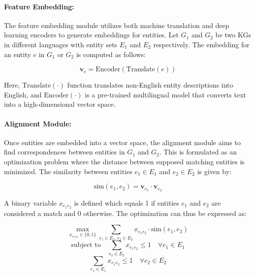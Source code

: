 \paragraph{Feature Embedding:}  The feature embedding module utilizes both machine translation and deep learning encoders to generate embeddings for entities. Let $G_1$ and $G_2$ be two KGs in different languages with entity sets $E_1$ and $E_2$ respectively. The embedding for an entity $e$ in $G_1$ or $G_2$ is computed as follows:

\begin{equation}
	\mathbf{v}_e = \text{Encoder}(\text{Translate}(e))
\end{equation}

Here, $\text{Translate}(\cdot)$ function translates non-English entity descriptions into English, and $\text{Encoder}(\cdot)$ is a pre-trained multilingual model that converts text into a high-dimensional vector space.

\paragraph{Alignment Module:} Once entities are embedded into a vector space, the alignment module aims to find correspondences between entities in $G_1$ and $G_2$. This is formulated as an optimization problem where the distance between supposed matching entities is minimized. The similarity between entities $e_1 \in E_1$ and $e_2 \in E_2$ is given by:

\begin{equation}
	\text{sim}(e_1, e_2) = \mathbf{v}_{e_1} \cdot \mathbf{v}_{e_2}
\end{equation}

A binary variable $x_{e_1e_2}$ is defined which equals 1 if entities $e_1$ and $e_2$ are considered a match and 0 otherwise. The optimization can thus be expressed as:

\begin{equation}
	\max_{x_{e_1e_2} \in \{0,1\}} \sum_{e_1 \in E_1, e_2 \in E_2} x_{e_1e_2} \cdot \text{sim}(e_1, e_2)
\end{equation}
\begin{equation}
	\text{subject to} \quad \sum_{e_2 \in E_2} x_{e_1e_2} \leq 1 \quad \forall e_1 \in E_1
\end{equation}
\begin{equation}
	\sum_{e_1 \in E_1} x_{e_1e_2} \leq 1 \quad \forall e_2 \in E_2
\end{equation}

